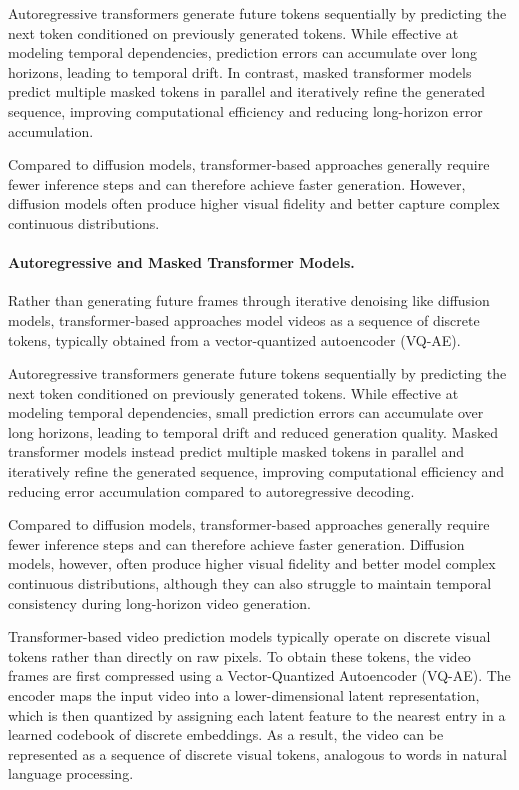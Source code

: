 Autoregressive transformers generate future tokens sequentially by predicting the next token conditioned on previously generated tokens. While effective at modeling temporal dependencies, prediction errors can accumulate over long horizons, leading to temporal drift. In contrast, masked transformer models predict multiple masked tokens in parallel and iteratively refine the generated sequence, improving computational efficiency and reducing long-horizon error accumulation.

Compared to diffusion models, transformer-based approaches generally require fewer inference steps and can therefore achieve faster generation. However, diffusion models often produce higher visual fidelity and better capture complex continuous distributions.


\paragraph{Autoregressive and Masked Transformer Models.}
Rather than generating future frames through iterative denoising like diffusion models, transformer-based approaches model videos as a sequence of discrete tokens, typically obtained from a vector-quantized autoencoder (VQ-AE).

Autoregressive transformers generate future tokens sequentially by predicting the next token conditioned on previously generated tokens. While effective at modeling temporal dependencies, small prediction errors can accumulate over long horizons, leading to temporal drift and reduced generation quality. 
Masked transformer models instead predict multiple masked tokens in parallel and iteratively refine the generated sequence, improving computational efficiency and reducing error accumulation compared to autoregressive decoding.

Compared to diffusion models, transformer-based approaches generally require fewer inference steps and can therefore achieve faster generation. Diffusion models, however, often produce higher visual fidelity and better model complex continuous distributions, although they can also struggle to maintain temporal consistency during long-horizon video generation.



Transformer-based video prediction models typically operate on discrete visual tokens rather than directly on raw pixels. To obtain these tokens, the video frames are first compressed using a Vector-Quantized Autoencoder (VQ-AE). The encoder maps the input video into a lower-dimensional latent representation, which is then quantized by assigning each latent feature to the nearest entry in a learned codebook of discrete embeddings. As a result, the video can be represented as a sequence of discrete visual tokens, analogous to words in natural language processing.


